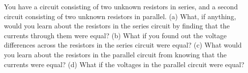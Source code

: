 You have a circuit consisting of two unknown resistors in
        series, and a second circuit consisting of two unknown
        resistors in parallel.  \hwendpart
        (a) What, if anything, would you
        learn about the resistors in the series circuit by finding
        that the currents through them were equal? \hwendpart 
        (b) What if you
        found out the voltage differences across the resistors in
        the series circuit were equal?  \hwendpart
        (c) What would you learn
        about the resistors in the parallel circuit from knowing
        that the currents were equal?  \hwendpart
        (d) What if the voltages in
        the parallel circuit were equal?
